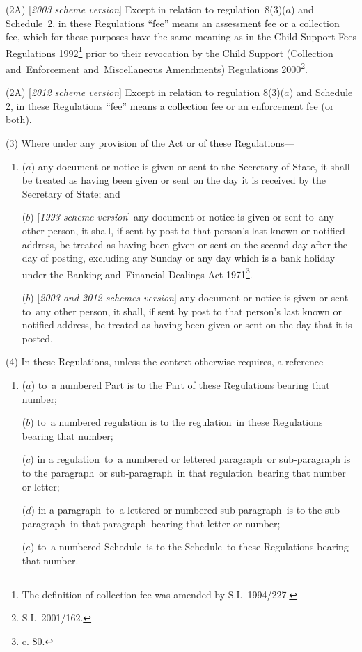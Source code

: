 \documentclass[12pt,a4paper]{article}
\begin{document}
(2A) [\emph{2003 scheme version}] Except in relation to regulation~8(3)($a$)  and Schedule~2, in these Regulations “fee” means an assessment fee or a collection fee, which for these purposes have the same meaning as in the Child Support Fees Regulations 1992\footnote{The definition of collection fee was amended by S.I.~1994/227.} prior to their revocation by the Child Support (Collection and~Enforcement and~Miscellaneous Amendments) Regulations 2000\footnote{S.I.~2001/162.}.

(2A) [\emph{2012 scheme version}] Except in relation to regulation 8(3)($a$)  and Schedule 2, in these Regulations “fee” means a collection fee or an enforcement fee (or both).

(3) Where under any provision of the Act or of these Regulations—
\begin{enumerate}\item[]
($a$) any document or notice is given or sent to the Secretary of State, it shall be treated as having been given or sent on the day it is received by the Secretary of State; and

($b$) [\emph{1993 scheme version}] any document or notice is given or sent to~any other person, it shall, if sent by post to that person’s last known or notified address, be treated as having been given or sent on the second day after the day of posting, excluding any Sunday or any day which is a bank holiday under the Banking and~Financial Dealings Act 1971\footnote{ c. 80.}.

($b$) [\emph{2003 and 2012 schemes version}] any document or notice is given or sent to~any other person, it shall, if sent by post to that person’s last known or notified address, be treated as having been given or sent on 
the day that it is posted.  %
\end{enumerate}

(4) In these Regulations, unless the context otherwise requires, a reference—
\begin{enumerate}\item[]
($a$) to~a numbered Part is to the Part of these Regulations bearing that number;

($b$) to~a numbered regulation is to the regulation~in these Regulations bearing that number;

($c$) in a regulation~to~a numbered or lettered paragraph~or sub-paragraph is to the paragraph~or sub-paragraph~in that regulation~bearing that number or letter;

($d$) in a paragraph~to~a lettered or numbered sub-paragraph~is to the sub-paragraph~in that paragraph~bearing that letter or number;

($e$) to~a numbered Schedule~is to the Schedule~to these Regulations bearing that number.
\end{enumerate}
\end{document}
